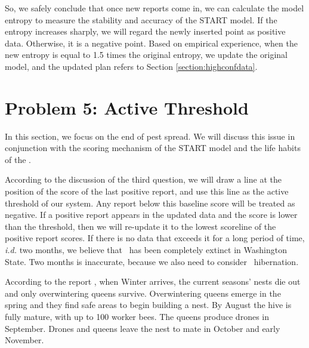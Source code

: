 \documentclass{mcmthesis}
\begin{document}
So, we safely conclude that once new reports come in, we can calculate the model entropy to measure the stability and accuracy of the START model. If the entropy increases sharply, we will regard the newly inserted point as positive data. Otherwise, it is a negative point. Based on empirical experience, when the new entropy is equal to 1.5 times the original entropy, we update the original model, and the updated plan refers to Section \ref{section:highconfdata}.

\section{Problem 5: Active Threshold}
In this section, we focus on the end of pest spread. We will discuss this issue in conjunction with the scoring mechanism of the START model and the life habits of the \VM.

According to the discussion of the third question, we will draw a line at the position of the score of the last positive report, and use this line as the active threshold of our system. Any report below this baseline score will be treated as negative. If a positive report appears in the updated data and the score is lower than the threshold, then we will re-update it to the lowest scoreline of the positive report scores. If there is no data that exceeds it for a long period of time, \emph{i.d.} two months, we believe that \VM\ has been completely extinct in Washington State. Two months is inaccurate, because we also need to consider \VM\  hibernation. 

According to the report \cite{AGH}, when Winter arrives, the current seasons' nests die out and only overwintering queens survive. Overwintering queens emerge in the spring and they find safe areas to begin building a nest. By August the hive is fully mature, with up to 100 worker bees. The queens produce drones in September. Drones and queens leave the nest to mate in October and early November.
\end{document}

